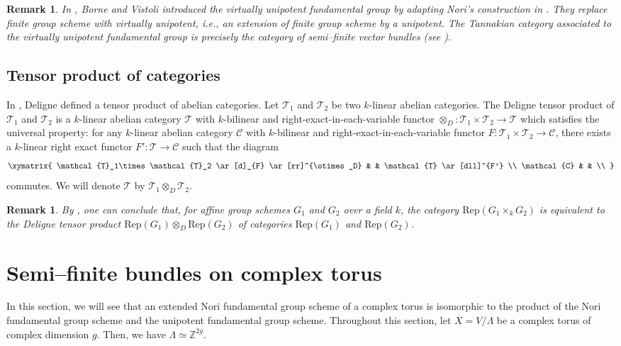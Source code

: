 \documentclass[12pt, reqno]{amsart}
\theoremstyle{plain}
\newtheorem{remark}[theorem]{Remark}
\numberwithin{equation}{section}
\begin{document}
\begin{remark}
\rm	In \cite{BV}, Borne and Vistoli introduced the virtually unipotent fundamental group by adapting Nori’s construction in \cite[Chapter-II]{No}. They replace finite group scheme with virtually unipotent, i.e., an extension of finite group scheme by a unipotent. The Tannakian category associated to the virtually unipotent fundamental group is precisely the category of semi--finite vector bundles (see \cite[Theorem 10.5]{BV}).
\end{remark}

\subsection*{Tensor product of categories}
In \cite[\S 5, p. 142]{PD}, Deligne defined a tensor product of abelian categories. Let $\mathcal{T}_1$ and $\mathcal{T}_2$ be two $k$-linear abelian categories. The Deligne tensor product of $\mathcal{T}_1$ and $\mathcal{T}_2$ is a $k$-linear abelian category $\mathcal{T}$ with $k$-bilinear and right-exact-in-each-variable functor $\otimes_D:\mathcal{T}_1\times \mathcal{T}_2 \rightarrow \mathcal{T}$ which satisfies the universal property: for any $k$-linear abelian category $\mathcal{C}$ with $k$-bilinear and right-exact-in-each-variable functor $F:\mathcal{T}_1\times \mathcal{T}_2 \rightarrow \mathcal{C}$, there exists a $k$-linear right exact functor $F':\mathcal{T} \rightarrow \mathcal{C}$ such that the diagram 
\[
\xymatrix{
	\mathcal{T}_1\times \mathcal{T}_2 \ar[d]_{F}  \ar[rr]^{\otimes_D}  & &  \mathcal{T} \ar[dll]^{F'} \\
	\mathcal{C}  & &  \\
}
\]
commutes. 
We will denote $\mathcal{T}$ by $\mathcal{T}_1\otimes_D \mathcal{T}_2$. 

\begin{remark}\label{Rep(G_1*G_2)= Rep(G_1)*Rep(G_2)}
	\rm By \cite[5.18, 6.21]{PD}, one can conclude that, for affine group schemes $G_1$ and $G_2$ over a field $k$, the category $\mathrm{Rep}(G_1\times_k G_2)$ is equivalent to the Deligne tensor product $\mathrm{Rep}(G_1)\otimes_D \mathrm{Rep}(G_2)$ of categories $\mathrm{Rep}(G_1)$ and $\mathrm{Rep}(G_2)$.
\end{remark}



\section{Semi--finite bundles on complex torus}
In this section, we will see that an extended Nori fundamental group scheme of a complex torus is isomorphic to the product of the Nori fundamental group scheme and the unipotent fundamental group scheme. Throughout this section, let $X=V/\Lambda$ be a complex torus of complex dimension $g$. Then, we have $\Lambda \simeq \mathbb{Z}^{2g}$.
\end{document}
